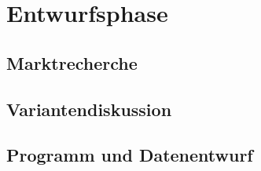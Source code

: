 \section{Entwurfsphase}
\label{sec:Entwurfsphase}



\subsection{Marktrecherche}
\label{sec:Marktrecherche}

\subsection{Variantendiskussion}
\label{sec:Marktrecherche}

\subsection{Programm und Datenentwurf}
\label{sec:ProgrammUDatenentwurf}